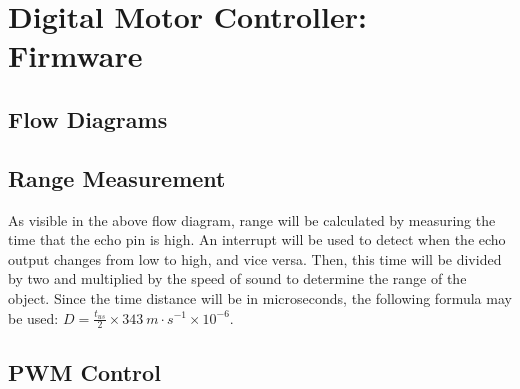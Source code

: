 \graphicspath{{content/2_design/figures/}}
\section{Digital Motor Controller: Firmware}

\subsection{Flow Diagrams}

\begin{figure}[!htb]
    \centering
    \begin{minipage}{.45\textwidth}
        \centering
        \label{fig:digitalMotorController_flowChart_setup}
    \end{minipage}
    \begin{minipage}{.45\textwidth}
        \centering
        \label{fig:digitalMotorController_flowChart_interrupt}
    \end{minipage}
    \begin{minipage}{.45\textwidth}
        \centering
        \label{fig:digitalMotorController_flowChart_loop}
    \end{minipage}
\end{figure}

\subsection{Range Measurement}

As visible in the above flow diagram, range will be calculated by measuring the time that the echo pin is high. An interrupt will be used to detect when
the echo output changes from low to high, and vice versa. Then, this time will be divided by two and multiplied by the speed of sound to determine
the range of the object. Since the time distance will be in microseconds, the following formula may be used: $D = \frac{t_{us}}{2} \times \SI{343}{m \cdot s^{-1}} \times 10^{-6}$.

\subsection{PWM Control}

